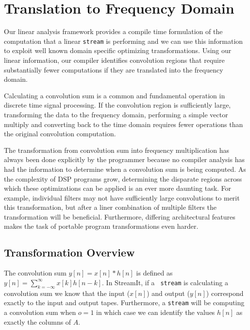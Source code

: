 
\section{Translation to Frequency Domain}
\label{sec:freq}

Our linear analysis framework provides a compile time formulation of
the computation that a linear {\tt stream} is performing and we can
use this information to exploit well known domain specific optimizing
transformations.  Using our linear information, our compiler
identifies convolution regions that require substantially fewer
computations if they are translated into the frequency domain.

Calculating a convolution sum is a common and fundamental operation in
discrete time signal processing.  If the convolution region is
sufficiently large, transforming the data to the frequency domain,
performing a simple vector multiply and converting back to the time
domain requires fewer operations than the original convolution
computation.

The transformation from convolution sum into frequency multiplication
has always been done explicitly by the programmer because no compiler
analysis has had the information to determine when a convolution sum
is being computed.  As the complexity of DSP programs grow,
determining the disparate regions across which these optimizations can
be applied is an ever more daunting task. For example, individual
filters may not have sufficiently large convolutions to merit this
transformation, but after a liner combination of multiple filters the
transformation will be beneficial.  Furthermore, differing
architectural features makes the task of portable program
transformations even harder.

\subsection{Transformation Overview}
The convolution sum $y[n]=x[n]*h[n]$ is defined as
$y[n]=\sum_{k=-\infty}^{\infty}x[k]h[n-k]$.  In StreamIt, if a {\tt
stream} is calculating a convolution sum we know that the input
($x[n]$) and output ($y[n]$) correspond exactly to the input and
output tapes.  Furthermore, a {\tt stream} will be computing a
convolution sum when $o=1$ in which case we can identify the values
$h[n]$ as exactly the columns of $A$.

